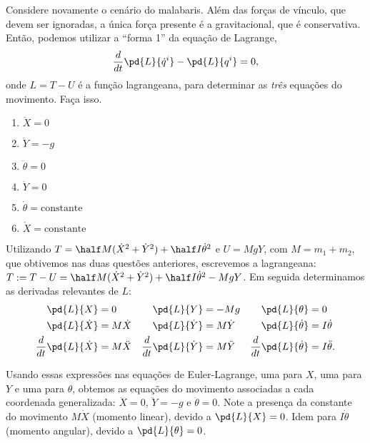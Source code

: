 \begin{question}
  	Considere novamente o cenário do malabaris.
  	Além das forças de vínculo, que devem ser ignoradas, a única força presente é a gravitacional, que é conservativa.
  	Então, podemos utilizar a ``forma 1'' da equação de Lagrange,
  	\begin{equation*}
  		\frac{d}{dt}\pd{L}{\dot q^i} - \pd{L}{q^i} = 0,
  	\end{equation*}
  	onde $L = T - U$ é a função lagrangeana, para determinar as \emph{três} equações do movimento.
  	Faça isso.

  	\begin{enumerate}
  		\item $\ddot X = 0$ \rightanswer
  		\item $\ddot Y = -g$ \rightanswer
  		\item $\ddot\theta = 0$ \rightanswer
  		\item $\ddot Y = 0$
  		\item $\dot\theta = \text{constante}$
  		\item $\dot X = \text{constante}$
  	\end{enumerate}

    \begin{solution}
      Utilizando $T = \half M (\dot X^2 + \dot Y^2) + \half I \dot\theta^2$ e $U = MgY$, com $M = m_1 + m_2$, que obtivemos nas duas questões anteriores, escrevemos a lagrangeana: $T := T - U = \half M (\dot X^2 + \dot Y^2) + \half I \dot\theta^2 - MgY$.
      Em seguida determinamos as derivadas relevantes de $L$:
      \begin{align*}
        \pd{L}{X} &= 0
          & \pd{L}{Y} &= -Mg
            & \pd{L}{\theta} &= 0 \\
        \pd{L}{\dot X} &= M\dot X
          & \pd{L}{\dot Y} &= M\dot Y
            & \pd{L}{\dot \theta} &= I\dot \theta \\
        \frac{d}{dt}\pd{L}{\dot X} &= M\ddot X
          & \frac{d}{dt}\pd{L}{\dot Y} &= M\ddot Y
            & \frac{d}{dt}\pd{L}{\dot \theta} &= I\ddot \theta.
      \end{align*}

      Usando essas expressões nas equações de Euler-Lagrange, uma para $X$, uma para $Y$ e uma para $\theta$, obtemos as equações do movimento associadas a cada coordenada generalizada: $\ddot X = 0$, $\ddot Y = -g$ e $\ddot \theta = 0$.
      Note a presença da constante do movimento $M\dot X$ (momento linear), devido a $\pd{L}{X} = 0$.
      Idem para $I\dot\theta$ (momento angular), devido a $\pd{L}{\theta} = 0$.
    \end{solution}
\end{question}